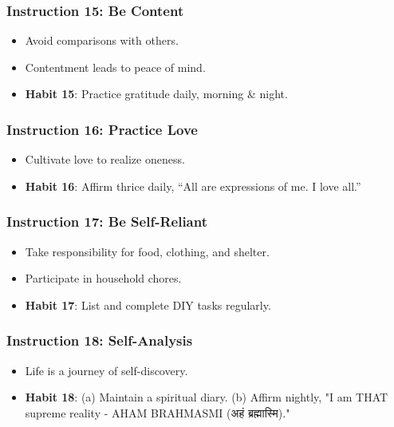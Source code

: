 \begin{frame}[fragile]\frametitle{Instruction 15: Be Content}
      \begin{itemize}
          \item Avoid comparisons with others.
          \item Contentment leads to peace of mind.
          \item \textbf{Habit 15}: Practice gratitude daily, morning \& night.
      \end{itemize}
\end{frame}

\begin{frame}[fragile]\frametitle{Instruction 16: Practice Love}
      \begin{itemize}
          \item Cultivate love to realize oneness.
          \item \textbf{Habit 16}: Affirm thrice daily, ``All are expressions of me. I love all.''
      \end{itemize}
\end{frame}

\begin{frame}[fragile]\frametitle{Instruction 17: Be Self-Reliant}
      \begin{itemize}
          \item Take responsibility for food, clothing, and shelter.
          \item Participate in household chores.
          \item \textbf{Habit 17}: List and complete DIY tasks regularly.
      \end{itemize}
\end{frame}

\begin{frame}[fragile]\frametitle{Instruction 18: Self-Analysis}
      \begin{itemize}
          \item Life is a journey of self-discovery.
          \item \textbf{Habit 18}: (a) Maintain a spiritual diary. (b) Affirm nightly, "I am THAT supreme reality - AHAM BRAHMASMI (अहं ब्रह्मास्मि)."
      \end{itemize}
\end{frame}

